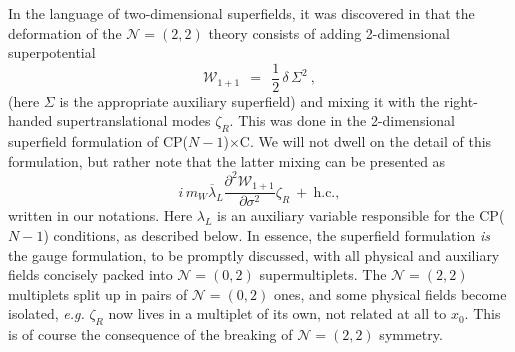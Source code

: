 \documentclass[12pt]{article}
\newcommand{\ntwot}{${\mathcal N}= \left(2,2\right) $ }
\newcommand{\ntwoo}{${\mathcal N}= \left(0,2\right) $ }
\newcommand{\p}{\partial}
\newcommand{\ov}{\overline}
\newcommand{\mc}[1]{\mathcal{#1}}
\newcommand{\CPCn}{CP($N-1$)$\times$C}
\begin{document}
	In the language of two-dimensional superfields, it was discovered in \cite{Edalati} that
the deformation of the \ntwot theory consists of adding 2-dimensional superpotential
\[
	\mathcal{W}_{1+1} ~~=~~ \frac{1}{2}\,\delta\,\Sigma^2~,
\]
(here $ \Sigma $ is the appropriate auxiliary superfield)
and mixing it with the right-handed supertranslational modes $ \zeta_R $. 
This was done in the 2-dimensional superfield formulation of \CPCn.
	We will not dwell on the detail of this formulation, but rather note that the latter
mixing can be presented as
\[
	i\, m_W \ov{\lambda}_L \frac{\p^2 \mc{W}_{1+1}}{\p \sigma^2} \zeta_R  ~+~ \text{h.c.},
\]
	written in our notations. 
	Here $ \lambda_L $ is an auxiliary variable responsible for the CP($N-1$) conditions, as described below.
	In essence, the superfield formulation \emph{is} the gauge formulation, to be promptly discussed, with
	all physical and auxiliary fields concisely packed into \ntwoo supermultiplets.
	The \ntwot multiplets split up in pairs of \ntwoo ones, and some physical fields become
	isolated, {\it e.g.} $ \zeta_R $ now lives in a multiplet of its own, not related at all to $ x_0 $.
	This is of course the consequence of the breaking of \ntwot symmetry.
\end{document}

